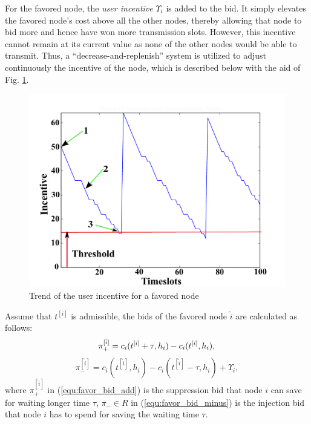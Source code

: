 \documentclass[journal]{IEEEtran}  %
\begin{document}
For the favored node, the \textit{user incentive} $\Upsilon_i$ is added to the
bid.
It simply elevates the favored node's cost above all the other nodes, thereby
allowing that node to bid more and hence have won more transmission slots.
However, this incentive cannot remain at its current value as none of the
other nodes would be able to transmit.  Thus, a ``decrease-and-replenish''
system is utilized to adjust continuously the incentive of the node, which is
described below with the aid of Fig. \ref{fig:incentive}. 
\begin{figure}[htpb]
\centering
\includegraphics[width=0.8\columnwidth]{Tex_Picts/incentive_trend_annotated-crop.pdf} 
\caption{Trend of the user incentive for a favored node}
\label{fig:incentive}
\end{figure}

Assume that $t^{[i]}$ is admissible, the bids of the favored node $\hat{i}$ are
calculated as follows:
\begin{equation}
 \pi_{+}^{[\hat{i}]} = c_i(t^{[i]}+\tau,h_i)- c_i(t^{[i]},h_i),  \\
\label{equ:favor_bid_add}
\end{equation}
\begin{equation}
\pi_-^{[\hat{i}]} = c_i(t^{[\hat{i}]},h_i)- c_i(t^{[\hat{i}]}-\tau,h_i) + \Upsilon_i, 
\label{equ:favor_bid_minus}
\end{equation}
where 
 $\pi_{+}^{[\hat{i}]}$ in (\ref{equ:favor_bid_add}) is the 
suppression bid that node $i$ can save for waiting longer time $\tau$, 
$\pi_- \in R$ in (\ref{equ:favor_bid_minus}) is the 
injection bid that node $i$ has to spend for saving the waiting time $\tau$.
\end{document}
